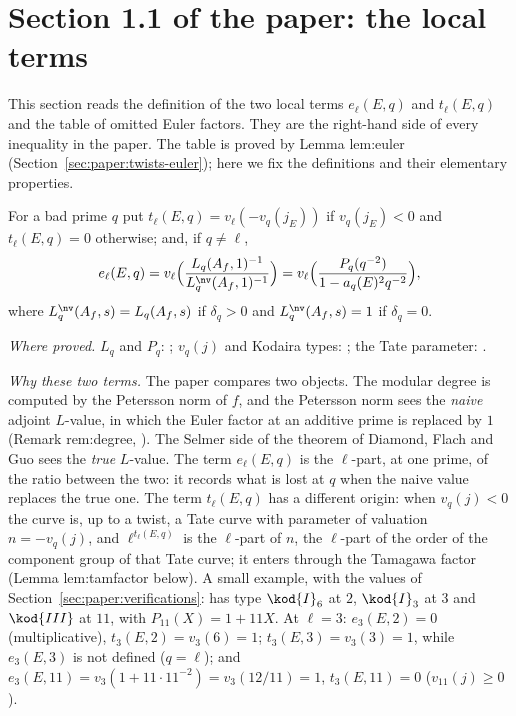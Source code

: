 \begin{sloppypar}
\section[Paper 1.1: the local terms]{Section 1.1 of the paper: the local terms}\label{sec:paper:local-terms}

This section reads the definition of the two local terms $e_\ell(E,q)$ and $t_\ell(E,q)$ and the table of omitted Euler factors. They are the
right-hand side of every inequality in the paper. The table is proved by Lemma lem:euler (Section~\ref{sec:paper:twists-euler}); here we fix the
definitions and their elementary properties.

\begin{definition}\label{def:paper:terms}
For a bad prime $q$ put $t_\ell(E,q)=v_\ell(-v_q(j_E))$ if $v_q(j_E)<0$ and $t_\ell(E,q)=0$ otherwise; and, if $q\ne\ell$,
\[
e_\ell(E,q)=v_\ell\Bigl(\frac{L_q(A_f,1)^{-1}}{L^{\nv}_q(A_f,1)^{-1}}\Bigr)=v_\ell\Bigl(\frac{P_q(q^{-2})}{1-a_q(E)^2q^{-2}}\Bigr),
\]
where $L^{\nv}_q(A_f,s)=L_q(A_f,s)$ if $\delta_q>0$ and $L^{\nv}_q(A_f,s)=1$ if $\delta_q=0$.
\end{definition}

\noindent\emph{Where proved.} $L_q$ and $P_q$: ; $v_q(j)$ and Kodaira types: ; the Tate parameter: .

\emph{Why these two terms.} The paper compares two objects. The modular degree is computed by the Petersson norm of $f$, and the Petersson norm sees the
\emph{naive} adjoint $L$-value, in which the Euler factor at an additive prime is replaced by $1$ (Remark rem:degree, ). The Selmer side of
the theorem of Diamond, Flach and Guo sees the \emph{true} $L$-value. The term $e_\ell(E,q)$ is the $\ell$-part, at one prime, of the ratio between the two: it records what
is lost at $q$ when the naive value replaces the true one. The term $t_\ell(E,q)$ has a different origin: when $v_q(j)<0$ the curve is, up to a twist, a Tate curve with
parameter of valuation $n=-v_q(j)$, and $\ell^{t_\ell(E,q)}$ is the $\ell$-part of $n$, the $\ell$-part of the order of the component group of that Tate curve; it enters through
the Tamagawa factor (Lemma lem:tamfactor below). A small example, with the values of Section~\ref{sec:paper:verifications}:  has type $\kod{I}_6$ at $2$, $\kod{I}_3$
at $3$ and $\kod{III}$ at $11$, with $P_{11}(X)=1+11X$. At $\ell=3$: $e_3(E,2)=0$ (multiplicative), $t_3(E,2)=v_3(6)=1$; $t_3(E,3)=v_3(3)=1$, while $e_3(E,3)$ is not defined
($q=\ell$); and $e_3(E,11)=v_3(1+11\cdot11^{-2})=v_3(12/11)=1$, $t_3(E,11)=0$ ($v_{11}(j)\ge0$).


\end{sloppypar}
